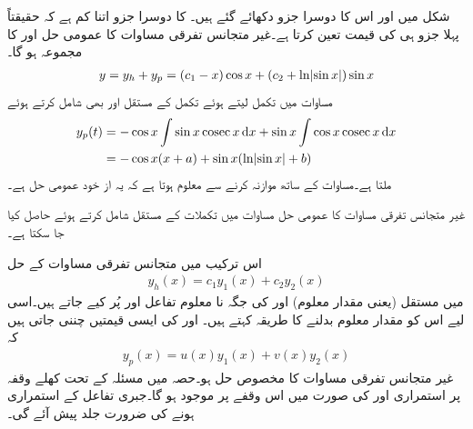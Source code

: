 شکل  میں  اور اس کا دوسرا جزو دکھائے گئے ہیں۔ کا دوسرا جزو اتنا کم ہے کہ حقیقتاً پہلا جزو  ہی  کی قیمت تعین کرتا ہے۔غیر متجانس تفرقی مساوات کا عمومی حل  اور  کا مجموعہ ہو گا۔
\begin{align}\label{مساوات_سادہ_دو_مثال_متعین_متغیرات_تبدیلی_ب}
y=y_h+y_p=(c_1-x)\cos x+(c_2+\ln\abs{\sin x})\sin x
\end{align}
مساوات  میں تکمل لیتے ہوئے تکمل کے مستقل  اور  بھی شامل کرتے ہوئے
\begin{align*}
y_p(t)&=-\cos x\int \sin x \cosec x\dif x+\sin x\int \cos x \cosec x\dif x\\
&=-\cos x(x+a)+\sin x(\ln\abs{\sin x}+b)
\end{align*}
ملتا ہے۔مساوات  کے ساتھ موازنہ کرنے سے معلوم ہوتا ہے کہ یہ از خود عمومی حل ہے۔

غیر متجانس تفرقی مساوات  کا عمومی حل  مساوات  میں تکملات کے مستقل شامل کرتے ہوئے حاصل کیا جا سکتا ہے۔


اس ترکیب میں متجانس تفرقی مساوات کے حل
\begin{align*}
 y_h(x)=c_1y_1(x)+c_2y_2(x)
\end{align*}
میں مستقل (یعنی مقدار معلوم)  اور   کی جگہ نا معلوم تفاعل  اور  پُر کیے جاتے ہیں۔اسی لیے اس کو مقدار معلوم بدلنے کا طریقہ کہتے ہیں۔ اور  کی ایسی قیمتیں چننی جاتی ہیں کہ
\begin{align}\label{مساوات_سادہ_دو_غیر_متجانس_خطی_ٹ}
y_p(x)=u(x)y_1(x)+v(x)y_2(x)
\end{align}
غیر متجانس تفرقی مساوات  کا مخصوص حل ہو۔حصہ  میں مسئلہ  کے تحت کھلے وقفہ  پر استمراری  اور  کی صورت میں اس وقفے پر  موجود ہو گا۔جبری تفاعل  کے استمراری ہونے کی ضرورت جلد پیش آئے گی۔

